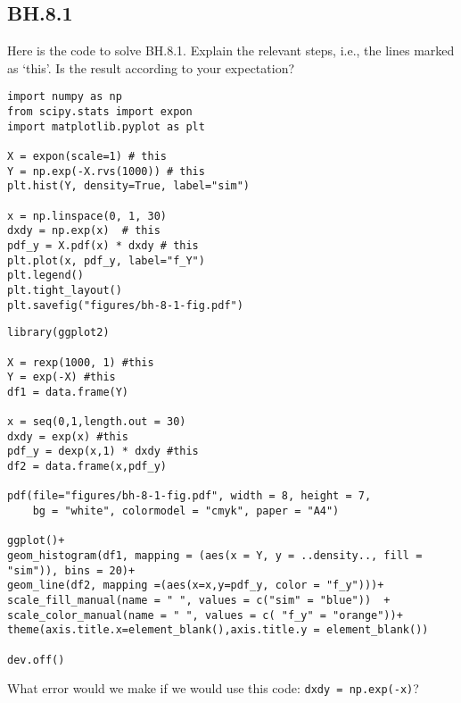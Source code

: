 

\subsection{BH.8.1}
\label{sec:bh-8.1}

\begin{exercise}
Here is the code to solve BH.8.1. Explain the relevant steps, i.e., the lines marked as `this'. Is the result according to your expectation?
\begin{verbatim}
import numpy as np
from scipy.stats import expon
import matplotlib.pyplot as plt

X = expon(scale=1) # this
Y = np.exp(-X.rvs(1000)) # this
plt.hist(Y, density=True, label="sim")

x = np.linspace(0, 1, 30)
dxdy = np.exp(x)  # this
pdf_y = X.pdf(x) * dxdy # this
plt.plot(x, pdf_y, label="f_Y")
plt.legend()
plt.tight_layout()
plt.savefig("figures/bh-8-1-fig.pdf")
\end{verbatim}

\begin{verbatim}
library(ggplot2)

X = rexp(1000, 1) #this
Y = exp(-X) #this
df1 = data.frame(Y)

x = seq(0,1,length.out = 30)
dxdy = exp(x) #this
pdf_y = dexp(x,1) * dxdy #this
df2 = data.frame(x,pdf_y)

pdf(file="figures/bh-8-1-fig.pdf", width = 8, height = 7, 
    bg = "white", colormodel = "cmyk", paper = "A4")   

ggplot()+
geom_histogram(df1, mapping = (aes(x = Y, y = ..density.., fill = "sim")), bins = 20)+
geom_line(df2, mapping =(aes(x=x,y=pdf_y, color = "f_y")))+
scale_fill_manual(name = " ", values = c("sim" = "blue"))  +
scale_color_manual(name = " ", values = c( "f_y" = "orange"))+
theme(axis.title.x=element_blank(),axis.title.y = element_blank())

dev.off()
\end{verbatim}

\end{exercise}

\begin{exercise}
What error would we make if we would use this code: \verb|dxdy = np.exp(-x)|?
\end{exercise}



